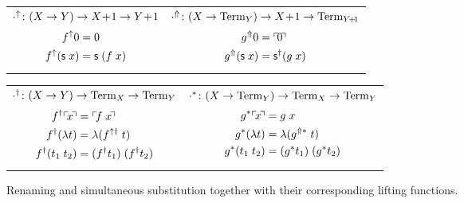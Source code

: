 \begin{figure}[t]
  \begin{center}
    \begin{tabular}{p{}p{}}
      {$\cdot^\uparrow \colon (X \to Y) \to X\!+\!1 \to Y\!+\!1$
      \begin{alignat*}{2}
        f^\uparrow 0            & = 0 \\
        f^\uparrow (\mathsf{s}\;x) & = \mathsf{s}\;(f \; x)
      \end{alignat*}} &
      {$\cdot^\Uparrow \colon (X \to \mathrm{Term}_{Y}) \to X\!+\!1 \to \mathrm{Term}_{Y\!+\!1}$
      \begin{alignat*}{2}
        g^\Uparrow 0              & = \ulcorner\! 0 \!\urcorner \\
        g^\Uparrow (\mathsf{s} \; x) & = \mathsf{s}^\dagger(g\;x)
      \end{alignat*}}
    \end{tabular}

    \begin{tabular}{p{}p{}}
      {$\cdot^\dagger \colon (X \to Y) \to \mathrm{Term}_{X} \to \mathrm{Term}_{Y}$
      \begin{alignat*}{2}
        f^\dagger\ulcorner\! x \!\urcorner   & = \ulcorner\! f\;x \!\urcorner \\
        f^\dagger(\lambda t) & = \lambda(f^{\uparrow\dagger}\;t) \\
        f^\dagger(t_1\;t_2)  & = (f^\dagger t_1)\;(f^\dagger t_2)
      \end{alignat*}} &
      {$\cdot^* \colon (X \to \mathrm{Term}_{Y}) \to \mathrm{Term}_{X} \to \mathrm{Term}_{Y}$
      \begin{alignat*}{2}
        g^*\ulcorner\! x \!\urcorner   & = g\;x \\
        g^*(\lambda t) & = \lambda (g^{\Uparrow*} \; t) \\
        g^*(t_1\;t_2)  & = (g^* t_1) \; (g^* t_2)
      \end{alignat*}}
    \end{tabular}
    \caption{Renaming and simultaneous substitution together with
      their corresponding lifting functions.}
    \label{fig:syntax_simultaneous_subst}
  \end{center}
\end{figure}

